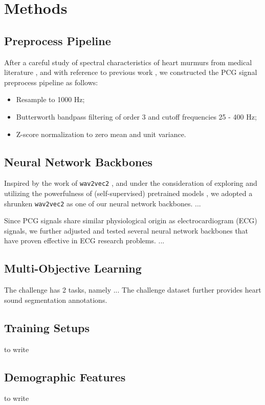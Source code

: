 \section{Methods}
\label{sec:methods}

\subsection{Preprocess Pipeline}
\label{subsec:preproc}

After a careful study of spectral characteristics of heart murmurs from medical literature \cite{Donnerstein_1989, Noponen_2007}, and with reference to previous work \cite{Schmidt_2010}, we constructed the PCG signal preprocess pipeline as follows:
\begin{itemize}
    \item Resample to 1000 Hz;
    \item Butterworth bandpass filtering of order 3 and cutoff frequencies 25 - 400 Hz;
    \item Z-score normalization to zero mean and unit variance.
\end{itemize}

\subsection{Neural Network Backbones}
\label{subsec:nn}

Inspired by the work of \texttt{wav2vec2} \cite{baevski2020wav2vec}, and under the consideration of exploring and utilizing the powerfulness of (self-supervised) pretrained models \cite{wolf-etal-2020-transformers}, we adopted a shrunken \texttt{wav2vec2} as one of our neural network backbones. ...

Since PCG signals share similar physiological origin as electrocardiogram (ECG) signals, we further adjusted and tested several neural network backbones \cite{Kang_2022_cinc2021_iop} that have proven effective in ECG research problems. ...

\subsection{Multi-Objective Learning}
\label{subsec:mol}

The challenge has 2 tasks, namely ... The challenge dataset \cite{Oliveira_2021_CirCor} further provides heart sound segmentation annotations.

\cite{Caruana_1997_mtl}

\subsection{Training Setups}
\label{subsec:training}

to write


\subsection{Demographic Features}
\label{subsec:demo_feat}

to write
